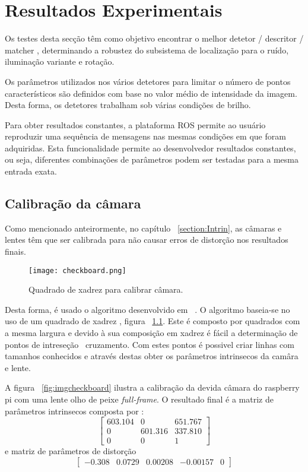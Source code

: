 \chapter{Resultados Experimentais} \label{chap:resexp}


Os testes desta secção têm como objetivo encontrar o melhor detetor / descritor / matcher , determinando a robustez do subsistema de localização para o ruído, iluminação variante e rotação.

Os parâmetros utilizados nos vários detetores para limitar o número de pontos característicos são definidos com base no valor médio de intensidade da imagem. Desta forma, os detetores trabalham sob várias condições de brilho.

Para obter resultados constantes, a plataforma ROS permite ao usuário reproduzir uma sequência de mensagens nas mesmas condições em que foram adquiridas. Esta funcionalidade permite ao desenvolvedor resultados constantes, ou seja, diferentes combinações de parâmetros podem ser testadas para a mesma entrada exata.

\section{Calibração da câmara}

Como mencionado anteirormente, no capítulo ~\ref{section:Intrin}, as câmaras e lentes têm que ser calibrada para não causar erros de distorção nos resultados finais. 

\begin{figure}[h!]  %
	\centering
	\texttt{[image: checkboard.png]} 
	\caption{Quadrado de xadrez para calibrar câmara.}
	\label{fig:checkboard}  %
\end{figure}

Desta forma, é usado o algoritmo desenvolvido em ~\cite{piCam}. O algoritmo baseia-se no uso de um quadrado de xadrez , figura ~\ref{fig:checkboard}. Este é composto por quadrados com a mesma largura e devido à sua composição em xadrez é fácil a determinação de pontos de intreseção \ cruzamento. Com estes pontos é possivel criar linhas com tamanhos conhecidos e através destas obter os parâmetros intrinsecos da camâra e lente. 



A figura ~\ref{fig:imgcheckboard} ilustra a calibração da devida câmara do raspberry pi com uma lente olho de peixe \textit{full-frame}. O resultado final é a matriz de parâmetros intrinsecos composta por : \[ \left[ \begin{array}{ccc}
603.104 & 0 & 651.767 \\ 
0 & 601.316 & 337.810 \\ 
0 & 0 & 1
\end{array} \right] \] e matriz de parâmetros de distorção \[ \left[\begin{array}{ccccc}
-0.308 & 0.0729 & 0.00208 & -0.00157 & 0 
\end{array} \right] \]

